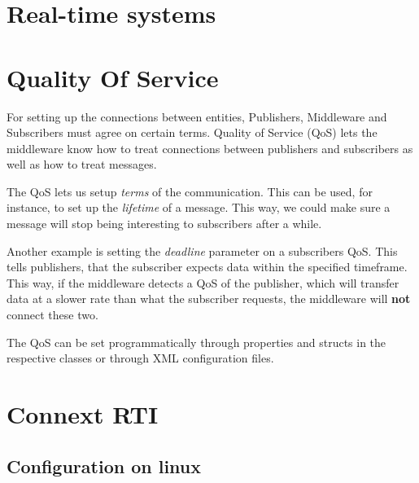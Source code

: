 \section{Real-time systems}


\section{Quality Of Service}
For setting up the connections between entities, Publishers, Middleware and Subscribers must agree on certain terms. Quality of Service (QoS) lets the middleware know how to treat connections between publishers and subscribers as well as how to treat messages.

The QoS lets us setup \textit{terms} of the communication. This can be used, for instance, to set up the \textit{lifetime} of a message. This way, we could make sure a message will stop being interesting to subscribers after a while. 

Another example is setting the \textit{deadline} parameter on a subscribers QoS. This tells publishers, that the subscriber expects data within the specified timeframe. This way, if the middleware detects a QoS of the publisher, which will transfer data at a slower rate than what the subscriber requests, the middleware will \textbf{not} connect these two.

The QoS can be set programmatically through properties and structs in the respective classes or through XML configuration files. 


\section{Connext RTI}


\subsection{Configuration on linux}